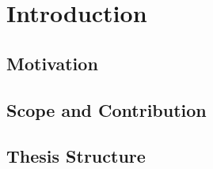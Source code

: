 %

\chapter{\label{ch:1-intro}Introduction} 


\section{Motivation}


\section{Scope and Contribution}

\section{Thesis Structure}

